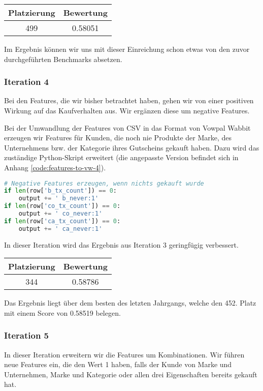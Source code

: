 \begin{tabular}{|c|c|}
	\hline \textbf{Platzierung} & \textbf{Bewertung} \\ 
	\hline 499 & 0.58051  \\ 
	\hline 
\end{tabular}

Im Ergebnis können wir uns mit dieser Einreichung
schon etwas von den zuvor durchgeführten Benchmarks absetzen.

\subsubsection{Iteration 4}
Bei den Features, die wir bisher betrachtet haben, gehen wir von einer
positiven Wirkung auf das Kaufverhalten aus. Wir ergänzen diese um negative Features.

Bei der Umwandlung der Features von CSV in das Format von Vowpal Wabbit 
erzeugen wir Features für Kunden, die noch nie Produkte der Marke,
des Unternehmens bzw. der Kategorie ihres Gutscheins gekauft haben.
Dazu wird das zuständige Python-Skript erweitert (die angepasste Version befindet sich in Anhang 
\ref{code:features-to-vw-4}).
\begin{lstlisting}[language=Python]
# Negative Features erzeugen, wenn nichts gekauft wurde
if len(row['b_tx_count']) == 0:
	output += ' b_never:1'
if len(row['co_tx_count']) == 0:
	output += ' co_never:1'
if len(row['ca_tx_count']) == 0:
	output += ' ca_never:1'
\end{lstlisting}

In dieser Iteration wird das Ergebnis aus Iteration 3 geringfügig verbessert.

\begin{tabular}{|c|c|}
	\hline \textbf{Platzierung} & \textbf{Bewertung} \\ 
	\hline 344 & 0.58786  \\ 
	\hline 
\end{tabular}

Das Ergebnis liegt über dem besten des letzten Jahrgangs, welche den 452. Platz mit einem Score von 0.58519 belegen.

\subsubsection{Iteration 5}

In dieser Iteration erweitern wir die Features um Kombinationen. Wir führen neue Features ein, die den Wert 1 haben,
falls der Kunde von Marke und Unternehmen, Marke und Kategorie oder allen drei Eigenschaften bereits
gekauft hat.

